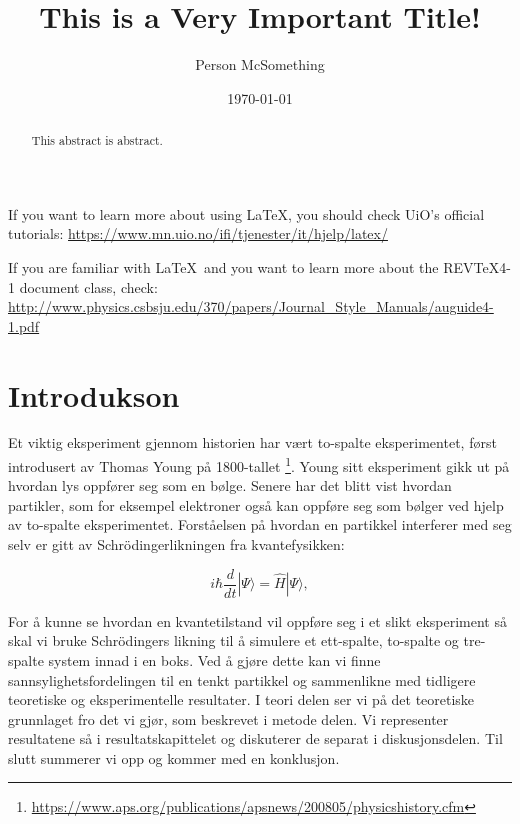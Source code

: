 \documentclass[reprint,english,notitlepage]{revtex4-2}  %
\begin{document}
\title{This is a Very Important Title!}   %
\author{Person McSomething}               %
\date{\today}                             %
\noaffiliation                            %
\begin{abstract}                          %
This abstract is abstract.                %
\end{abstract}                            %
\maketitle                                %

If you want to learn more about using \LaTeX, you should check UiO's official tutorials:
\url{https://www.mn.uio.no/ifi/tjenester/it/hjelp/latex/}

If you are familiar with \LaTeX\ and you want to learn more about the REVTeX4-1 document class, check:
\url{http://www.physics.csbsju.edu/370/papers/Journal_Style_Manuals/auguide4-1.pdf}


\section{Introdukson}

Et viktig eksperiment gjennom historien har vært to-spalte eksperimentet, først introdusert av Thomas Young på 1800-tallet \footnote{\url{https://www.aps.org/publications/apsnews/200805/physicshistory.cfm}}. Young sitt eksperiment gikk ut på hvordan lys oppfører seg som en bølge. Senere har det blitt vist hvordan partikler, som for eksempel elektroner også kan oppføre seg som bølger ved hjelp av to-spalte eksperimentet. Forståelsen på hvordan en partikkel interferer med seg selv er gitt av Schrödingerlikningen fra kvantefysikken:

\begin{equation}
i \hbar \frac{d}{dt} |\Psi\rangle = \hat{H} |\Psi\rangle,
\end{equation}

For å kunne se hvordan en kvantetilstand vil oppføre seg i et slikt eksperiment så skal vi bruke Schrödingers likning til å simulere et ett-spalte, to-spalte og tre-spalte system innad i en boks. Ved å gjøre dette kan vi finne sannsylighetsfordelingen til en tenkt partikkel og sammenlikne med tidligere teoretiske og eksperimentelle resultater. I teori delen ser vi på det teoretiske grunnlaget fro det vi gjør, som beskrevet i metode delen. Vi representer resultatene så i resultatskapittelet og diskuterer de separat i diskusjonsdelen. Til slutt summerer vi opp og kommer med en konklusjon.
\end{document}
